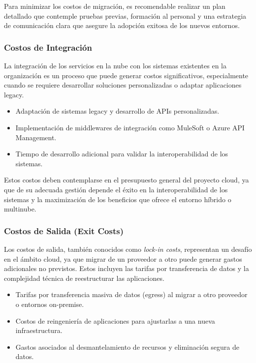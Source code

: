 {                Para minimizar los costos de migración, es recomendable realizar un plan detallado que contemple pruebas previas, formación al personal y una estrategia de comunicación clara que asegure la adopción exitosa de los nuevos entornos.
                
            \subsubsection{Costos de Integración}
                La integración de los servicios en la nube con los sistemas existentes en la organización es un proceso que puede generar costos significativos, especialmente cuando se requiere desarrollar soluciones personalizadas o adaptar aplicaciones legacy.
                
                \begin{itemize}
                    \item Adaptación de sistemas legacy y desarrollo de APIs personalizadas.
                    \item Implementación de middlewares de integración como MuleSoft o Azure API Management.
                    \item Tiempo de desarrollo adicional para validar la interoperabilidad de los sistemas.
                \end{itemize}
                
                Estos costos deben contemplarse en el presupuesto general del proyecto cloud, ya que de su adecuada gestión depende el éxito en la interoperabilidad de los sistemas y la maximización de los beneficios que ofrece el entorno híbrido o multinube.
                
            \subsubsection{Costos de Salida (Exit Costs)}
                Los costos de salida, también conocidos como \textit{lock-in costs}, representan un desafío en el ámbito cloud, ya que migrar de un proveedor a otro puede generar gastos adicionales no previstos. Estos incluyen las tarifas por transferencia de datos y la complejidad técnica de reestructurar las aplicaciones.
                
                \begin{itemize}
                    \item Tarifas por transferencia masiva de datos (egress) al migrar a otro proveedor o entornos on-premise.
                    \item Costos de reingeniería de aplicaciones para ajustarlas a una nueva infraestructura.
                    \item Gastos asociados al desmantelamiento de recursos y eliminación segura de datos.
                \end{itemize}

}
